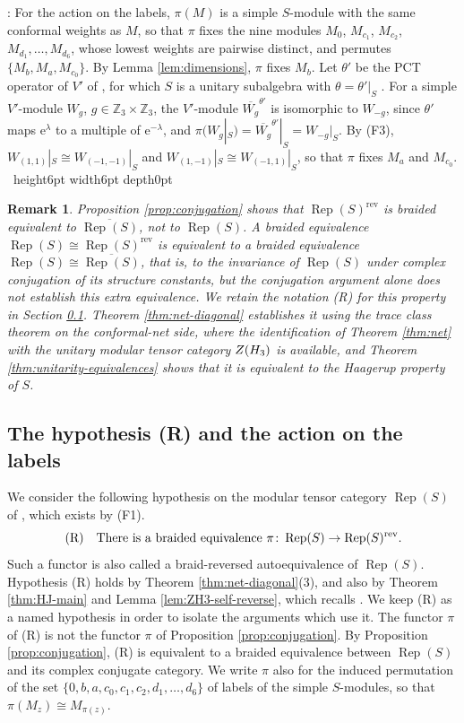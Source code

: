 \documentclass[leqno]{article}
\let\cal\relax
\newcommand{\cal}{\mathcal}
\newcommand{\Z}{\ensuremath{\mathbb{Z}}}
\newcommand{\qed}{\hfill \vrule height6pt  width6pt depth0pt}
\newcommand{\co}{\colon}
\newcommand{\ovl}{\overline}
\newcommand{\e}{\mathrm{e}}
\DeclareMathOperator{\Rep}{Rep}
\newtheorem{remark}[thm]{Remark}
\newenvironment{proof}[1][]{\noindent {\it Proof #1} : }{\hbox{~}\qed
\smallskip
}
\numberwithin{equation}{section}
\begin{document}
\begin{proof}
For the action on the labels, $\pi(M)$ is a simple $S$-module with the same conformal weights as $M$, so that $\pi$ fixes the nine modules $M_0$, $M_{c_1}$, $M_{c_2}$, $M_{d_1}, \ldots, M_{d_6}$, whose lowest weights are pairwise distinct, and permutes $\{M_b, M_a, M_{c_0}\}$. By Lemma \ref{lem:dimensions}, $\pi$ fixes $M_b$. Let $\theta'$ be the PCT operator of $V'$ of \cite[Theorem 4.12]{DoL14}, for which $S$ is a unitary subalgebra with $\theta = \theta'|_S$ \cite[Theorem 10.10]{Arh26}. For a simple $V'$-module $W_g$, $g \in \Z_3 \times \Z_3$, the $V'$-module $\ovl{W_g}^{\theta'}$ is isomorphic to $W_{-g}$, since $\theta'$ maps $\e^\lambda$ to a multiple of $\e^{-\lambda}$, and $\pi(W_g|_S) = \ovl{W_g}^{\theta'}|_S = W_{-g}|_S$. By (F3), $W_{(1,1)}|_S \cong W_{(-1,-1)}|_S$ and $W_{(1,-1)}|_S \cong W_{(-1,1)}|_S$, so that $\pi$ fixes $M_a$ and $M_{c_0}$.
\end{proof}

\begin{remark}\normalfont
\label{rem:rev-not-automatic}
Proposition \ref{prop:conjugation} shows that $\Rep(S)^{\mathrm{rev}}$ is braided equivalent to $\ovl{\Rep(S)}$, not to $\Rep(S)$. A braided equivalence $\Rep(S) \cong \Rep(S)^{\mathrm{rev}}$ is equivalent to a braided equivalence $\Rep(S) \cong \ovl{\Rep(S)}$, that is, to the invariance of $\Rep(S)$ under complex conjugation of its structure constants, but the conjugation argument alone does not establish this extra equivalence. We retain the notation (R) for this property in Section \ref{subsec:hypothesis-R}. Theorem \ref{thm:net-diagonal} establishes it using the trace class theorem on the conformal-net side, where the identification of Theorem \ref{thm:net} with the unitary modular tensor category $Z(\cal H_3)$ is available, and Theorem \ref{thm:unitarity-equivalences} shows that it is equivalent to the Haagerup property of $S$.
\end{remark}


\subsection{The hypothesis \textup{(R)} and the action on the labels}
\label{subsec:hypothesis-R}

We consider the following hypothesis on the modular tensor category $\Rep(S)$ of \cite{Hua08}, which exists by (F1).
\[
\textup{(R)}\quad \text{There is a braided equivalence } \pi \co \Rep(S) \to \Rep(S)^{\mathrm{rev}}.
\]
Such a functor is also called a braid-reversed autoequivalence of $\Rep(S)$. Hypothesis (R) holds by Theorem \ref{thm:net-diagonal}(3), and also by Theorem \ref{thm:HJ-main} and Lemma \ref{lem:ZH3-self-reverse}, which recalls \cite[Proposition 7.12(1)]{ArhII}. We keep (R) as a named hypothesis in order to isolate the arguments which use it. The functor $\pi$ of (R) is not the functor $\pi$ of Proposition \ref{prop:conjugation}. By Proposition \ref{prop:conjugation}, (R) is equivalent to a braided equivalence between $\Rep(S)$ and its complex conjugate category. We write $\pi$ also for the induced permutation of the set $\{0,b,a,c_0,c_1,c_2,d_1,\ldots,d_6\}$ of labels of the simple $S$-modules, so that $\pi(M_z) \cong M_{\pi(z)}$.
\end{document}

